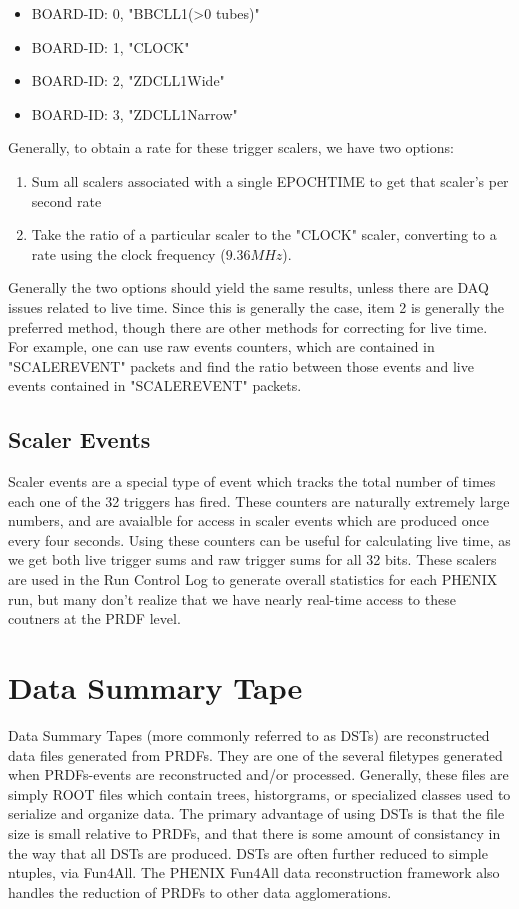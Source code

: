 \begin{itemize}
\item BOARD-ID: 0, "BBCLL1(\textgreater0 tubes)"
\item BOARD-ID: 1, "CLOCK"
\item BOARD-ID: 2, "ZDCLL1Wide"
\item BOARD-ID: 3, "ZDCLL1Narrow"
\end{itemize}

Generally, to obtain a rate for these trigger scalers, we have two options:
\begin{enumerate}
\item Sum all scalers associated with a single EPOCHTIME to get that scaler's per second
rate
\item Take the ratio of a particular scaler to the "CLOCK" scaler, converting to a rate
using the clock frequency ($9.36MHz$).
\end{enumerate}

Generally the two options should yield the same results, unless there are DAQ issues
related to live time. Since this is generally the case, item 2 is generally the preferred
method, though there are other methods for correcting for live time. For example, one can
use raw events counters, which are contained in "SCALEREVENT" packets and find the ratio
between those events and live events contained in "SCALEREVENT" packets.


\subsection{Scaler Events}
Scaler events are a special type of event which tracks the total number of times each one
of the 32 triggers has fired. These counters are naturally extremely large numbers, and
are avaialble for access in scaler events which are produced once every four seconds.
Using these counters can be useful for calculating live time, as we get both live trigger
sums and raw trigger sums for all 32 bits. These scalers are used in the Run Control Log
to generate overall statistics for each PHENIX run, but many don't realize that we have
nearly real-time access to these coutners at the PRDF level.

\section{Data Summary Tape}
Data Summary Tapes (more commonly referred to as DSTs) are reconstructed data files
generated from PRDFs. They are one of the several filetypes generated when PRDFs-events
are reconstructed and/or processed. Generally, these files are simply ROOT files which
contain trees, historgrams, or specialized classes used to serialize and organize data.
The primary advantage of using DSTs is that the file size is small relative to PRDFs, and
that there is some amount of consistancy in the way that all DSTs are produced. DSTs are
often further reduced to simple ntuples, via Fun4All. The PHENIX Fun4All data
reconstruction framework also handles the reduction of PRDFs to other data agglomerations.

